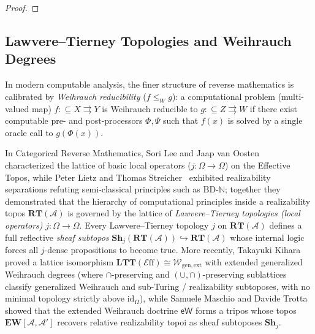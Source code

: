 \documentclass[10pt,twoside,openright]{book}
\theoremstyle{crmplain}
\theoremstyle{crmdef}
\theoremstyle{crmremark}
\newcommand{\Eff}{\mathcal{E}\mathrm{ff}}
\begin{document}
\begin{proof}
\end{proof}

\subsection{Lawvere--Tierney Topologies and Weihrauch Degrees}\label{subsec:ltt-weihrauch}

In modern computable analysis, the finer structure of reverse mathematics is calibrated by \emph{Weihrauch reducibility} ($f \le_W g$): a computational problem (multi-valued map) $f: \subseteq X \rightrightarrows Y$ is Weihrauch reducible to $g: \subseteq Z \rightrightarrows W$ if there exist computable pre- and post-processors $\Phi, \Psi$ such that $f(x)$ is solved by a single oracle call to $g(\Phi(x))$.

In Categorical Reverse Mathematics, Sori Lee and Jaap van Oosten~\cite{LeeVanOosten13,vanOosten08} characterized the lattice of basic local operators ($j: \Omega \to \Omega$) on the Effective Topos, while Peter Lietz and Thomas Streicher~\cite{LietzStreicher12} exhibited realizability separations refuting semi-classical principles such as $\mathrm{BD}$-$\mathbb{N}$; together they demonstrated that the hierarchy of computational principles inside a realizability topos $\mathbf{RT}(\mathcal{A})$ is governed by the lattice of \emph{Lawvere--Tierney topologies (local operators)} $j: \Omega \to \Omega$. Every Lawvere--Tierney topology $j$ on $\mathbf{RT}(\mathcal{A})$ defines a full reflective \emph{sheaf subtopos} $\mathbf{Sh}_j(\mathbf{RT}(\mathcal{A})) \hookrightarrow \mathbf{RT}(\mathcal{A})$ whose internal logic forces all $j$-dense propositions to become true. More recently, Takayuki Kihara~\cite{Kihara23} proved a lattice isomorphism $\mathbf{LTT}(\Eff) \cong \mathcal{W}_{\mathrm{gen,ext}}$ with extended generalized Weihrauch degrees (where $\cap$-preserving and $(\cup, \cap)$-preserving sublattices classify generalized Weihrauch and sub-Turing / realizability subtoposes, with no minimal topology strictly above $\mathrm{id}_\Omega$), while Samuele Maschio and Davide Trotta~\cite{MaschioTrotta26} showed that the extended Weihrauch doctrine $\mathsf{eW}$ forms a tripos whose topos $\mathbf{EW}[\mathcal{A}, \mathcal{A}']$ recovers relative realizability topoi as sheaf subtoposes $\mathbf{Sh}_j$.
\end{document}
